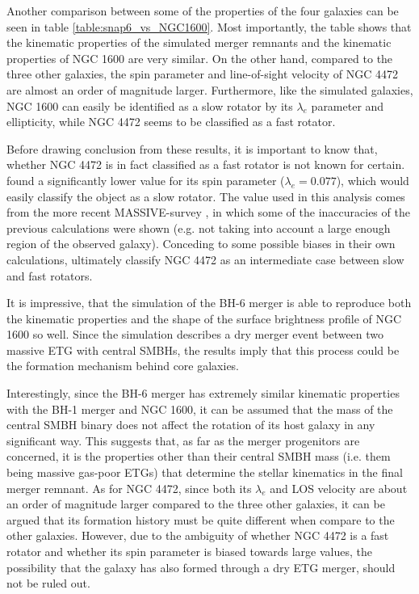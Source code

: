 \documentclass[english, oneside]{HYgradu}
\begin{document}
Another comparison between some of the properties of the four galaxies can be seen in table \ref{table:snap6_vs_NGC1600}. Most importantly, the table shows that the kinematic properties of the simulated merger remnants and the kinematic properties of NGC 1600 are very similar. On the other hand, compared to the three other galaxies, the spin parameter and line-of-sight velocity of NGC 4472 are almost an order of magnitude larger. Furthermore, like the simulated galaxies, NGC 1600 can easily be identified as a slow rotator by its $\lambda_e$ parameter and ellipticity, while NGC 4472 seems to be classified as a fast rotator. 

Before drawing conclusion from these results, it is important to know that, whether NGC 4472 is in fact classified as a fast rotator is not known for certain. \cite{Emsellem2011} found a significantly lower value for its spin parameter ($\lambda_e = 0.077$), which would easily classify the object as a slow rotator. The value used in this analysis comes from the more recent MASSIVE-survey \citep{Ma2014MASSIVE, Veale2017veldisp}, in which some of the inaccuracies of the previous calculations were shown (e.g. not taking into account a large enough region of the observed galaxy). Conceding to some possible biases in their own calculations, \cite{Veale2017veldisp} ultimately classify NGC 4472 as an intermediate case between slow and fast rotators.

It is impressive, that the simulation of the BH-6 merger is able to reproduce both the kinematic properties and the shape of the surface brightness profile of NGC 1600 so well. Since the simulation describes a dry merger event between two massive ETG with central SMBHs, the results imply that this process could be the formation mechanism behind core galaxies. 

Interestingly, since the BH-6 merger has extremely similar kinematic properties with the BH-1 merger and NGC 1600, it can be assumed that the mass of the central SMBH binary does not affect the rotation of its host galaxy in any significant way. This suggests that, as far as the merger progenitors are concerned, it is the properties other than their central SMBH mass (i.e. them being massive gas-poor ETGs) that determine the stellar kinematics in the final merger remnant. As for NGC 4472, since both its $\lambda_e$ and LOS velocity are about an order of magnitude larger compared to the three other galaxies, it can be argued that its formation history must be quite different when compare to the other galaxies. However, due to the ambiguity of whether NGC 4472 is a fast rotator and whether its spin parameter is biased towards large values, the possibility that the galaxy has also formed through a dry ETG merger, should not be ruled out.
\end{document}
